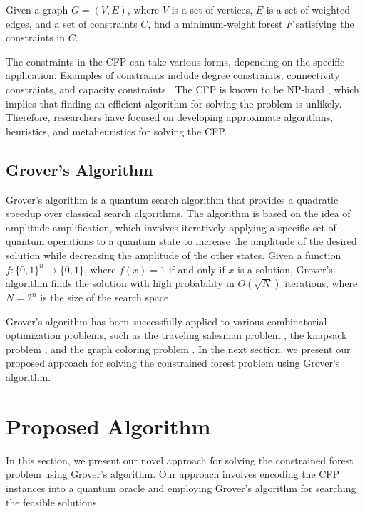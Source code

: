 \begin{definition}
Given a graph $G=(V,E)$, where $V$ is a set of vertices, $E$ is a set of weighted edges, and a set of constraints $C$, find a minimum-weight forest $F$ satisfying the constraints in $C$.
\end{definition}

The constraints in the CFP can take various forms, depending on the specific application. Examples of constraints include degree constraints, connectivity constraints, and capacity constraints \cite{constraints}. The CFP is known to be NP-hard \cite{cfp_np_hard}, which implies that finding an efficient algorithm for solving the problem is unlikely. Therefore, researchers have focused on developing approximate algorithms, heuristics, and metaheuristics for solving the CFP.

\subsection{Grover's Algorithm}

Grover's algorithm \cite{grover1996} is a quantum search algorithm that provides a quadratic speedup over classical search algorithms. The algorithm is based on the idea of amplitude amplification, which involves iteratively applying a specific set of quantum operations to a quantum state to increase the amplitude of the desired solution while decreasing the amplitude of the other states. Given a function $f: \{0,1\}^n \rightarrow \{0,1\}$, where $f(x) = 1$ if and only if $x$ is a solution, Grover's algorithm finds the solution with high probability in $O(\sqrt{N})$ iterations, where $N = 2^n$ is the size of the search space.

Grover's algorithm has been successfully applied to various combinatorial optimization problems, such as the traveling salesman problem \cite{TSP}, the knapsack problem \cite{knapsack}, and the graph coloring problem \cite{coloring}. In the next section, we present our proposed approach for solving the constrained forest problem using Grover's algorithm.

\section{Proposed Algorithm} \label{section_algorithm}

In this section, we present our novel approach for solving the constrained forest problem using Grover's algorithm. Our approach involves encoding the CFP instances into a quantum oracle and employing Grover's algorithm for searching the feasible solutions.

